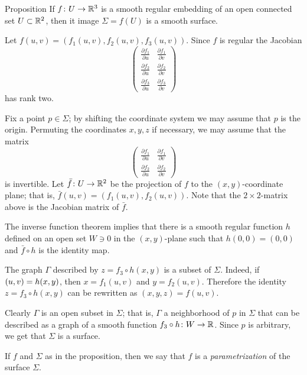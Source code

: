 \begin{thm}{Proposition}\label{prop:graph-chart}
If $f\colon U\to \mathbb{R}^3$ is a smooth regular embedding of an open connected set $U\subset \mathbb{R}^2$, then it image $\Sigma=f(U)$ is a smooth surface.
\end{thm}

Let $f(u,v)=(f_1(u,v),f_2(u,v),f_3(u,v))$.
Since $f$ is regular the Jacobian
\[
\renewcommand\arraystretch{1.3}
\begin{pmatrix}
\tfrac{\partial f_1}{\partial u}&\tfrac{\partial f_1}{\partial v}\\
\tfrac{\partial f_2}{\partial u}&\tfrac{\partial f_2}{\partial v}\\
\tfrac{\partial f_3}{\partial u}&\tfrac{\partial f_3}{\partial v}
\end{pmatrix}
\]
has rank two.

Fix a point $p\in \Sigma$; by shifting the coordinate system we may assume that $p$ is the origin.
Permuting the coordinates $x,y,z$ if necessary, we may assume that 
the matrix 
\[
\renewcommand\arraystretch{1.3}
\begin{pmatrix}
\tfrac{\partial f_1}{\partial u}&\tfrac{\partial f_1}{\partial v}\\
\tfrac{\partial f_2}{\partial u}&\tfrac{\partial f_2}{\partial v}
\end{pmatrix}
\]
is invertible.
Let $\bar f\colon U\to\mathbb{R}^2$ be the projection of $f$ to the $(x,y)$-coordinate plane;
that is, $\bar f(u,v)=(f_1(u,v),f_2(u,v))$.
Note that the $2\times2$-matrix above is the Jacobian matrix of $\bar f$.

The inverse function theorem implies that there is a smooth regular function $h$ defined on an open set $W\ni 0$ in the $(x,y)$-plane
such that $h(0,0)=(0,0)$ and $\bar f\circ h$ is the identity map.

The graph $\Gamma$ described by $z=f_3\circ h(x,y)$ is a subset of $\Sigma$.
Indeed, if $(u,v)\z=h(x,y)$, then $x=f_1(u,v)$ and $y=f_2(u,v)$.
Therefore the identity $z=f_3\circ h(x,y)$ can be rewritten as $(x,y,z)=f(u,v)$.

Clearly $\Gamma$ is an open subset in $\Sigma$;
that is, $\Gamma$ a neighborhood of $p$ in $\Sigma$ that can be described as a graph of a smooth function $f_3\circ h\colon W\to\mathbb{R}$.
Since $p$ is arbitrary, we get that $\Sigma$ is a surface.
\qeds

If $f$ and $\Sigma$ as in the proposition, then we say that $f$ is a \emph{parametrization} of the surface $\Sigma$. 


